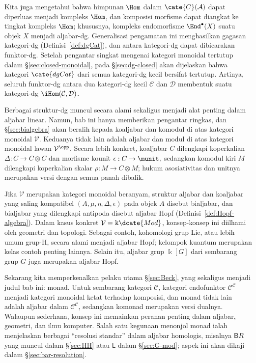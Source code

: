 Kita juga mengetahui bahwa himpunan $\Hom$ dalam $\cate{C}(\mathcal{A})$ dapat
diperluas menjadi kompleks $\Hom$, dan komposisi morfisme dapat diangkat
ke tingkat kompleks $\Hom$; khususnya, kompleks endomorfisme
$\End^\bullet(X)$ suatu objek $X$ menjadi aljabar-dg. Generalisasi pengamatan
ini menghasilkan gagasan kategori-dg (Definisi~\ref{def:dgCat}), dan antara
kategori-dg dapat dibicarakan funktor-dg. Setelah pengantar singkat mengenai
kategori monoidal tertutup dalam \S\ref{sec:closed-monoidal}, pada
\S\ref{sec:dg-closed} akan dijelaskan bahwa kategori $\cate{dgCat}$ dari semua
kategori-dg kecil bersifat tertutup. Artinya, seluruh funktor-dg antara dua
kategori-dg kecil $\mathcal{C}$ dan $\mathcal{D}$ membentuk suatu
kategori-dg $\iHom(\mathcal{C},\mathcal{D})$.

Berbagai struktur-dg muncul secara alami sekaligus menjadi alat penting dalam
aljabar linear. Namun, bab ini hanya memberikan pengantar ringkas, dan
\S\ref{sec:bialgebra} akan beralih kepada koaljabar dan komodul di atas
kategori monoidal $\mathcal{V}$. Keduanya tidak lain adalah aljabar dan modul
di atas kategori monoidal lawan $\mathcal{V}^{\opp}$. Secara lebih konkret,
koaljabar $C$ dilengkapi koperkalian $\Delta:C\to C\otimes C$ dan morfisme
kounit $\epsilon:C\to\munit$, sedangkan komodul kiri $M$ dilengkapi
koperkalian skalar $\rho:M\to C\otimes M$; hukum asosiativitas dan unitnya
merupakan versi dengan semua panah dibalik.

Jika $\mathcal{V}$ merupakan kategori monoidal beranyam, struktur aljabar dan
koaljabar yang saling kompatibel $(A,\mu,\eta,\Delta,\epsilon)$ pada objek $A$
disebut bialjabar, dan bialjabar yang dilengkapi antipoda disebut aljabar Hopf
(Definisi~\ref{def:Hopf-algebra}). Dalam kasus konkret
$\mathcal{V}=\Bbbk\dcate{Mod}$, konsep-konsep ini diilhami oleh geometri dan
topologi. Sebagai contoh, kohomologi grup Lie, atau lebih umum grup-H, secara
alami menjadi aljabar Hopf; kelompok kuantum merupakan kelas contoh penting
lainnya. Selain itu, aljabar grup $\Bbbk[G]$ dari sembarang grup $G$ juga
merupakan aljabar Hopf.

Sekarang kita memperkenalkan pelaku utama \S\ref{sec:Beck}, yang sekaligus
menjadi judul bab ini: monad. Untuk sembarang kategori $\mathcal{C}$, kategori
endofunktor $\mathcal{C}^{\mathcal{C}}$ menjadi kategori monoidal ketat terhadap
komposisi, dan monad tidak lain adalah aljabar dalam
$\mathcal{C}^{\mathcal{C}}$, sedangkan komonad merupakan versi dualnya.
Walaupun sederhana, konsep ini memainkan peranan penting dalam aljabar,
geometri, dan ilmu komputer. Salah satu kegunaan menonjol monad ialah
menjelaskan berbagai ``resolusi standar'' dalam aljabar homologis, misalnya
$\mathsf{B}R$ yang muncul dalam \S\ref{sec:HH} atau $\mathsf{L}$ dalam
\S\ref{sec:G-mod}; aspek ini akan dikaji dalam
\S\ref{sec:bar-resolution}.

